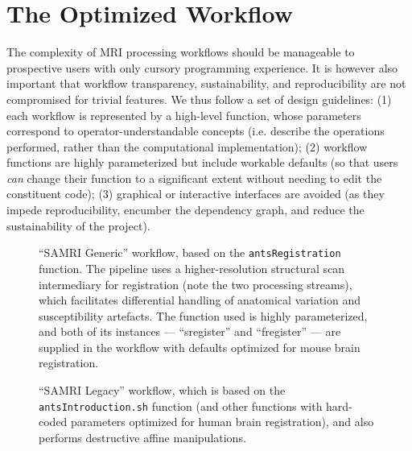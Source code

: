 \section{The Optimized Workflow}
The complexity of MRI processing workflows should be manageable to prospective users with only cursory programming experience.
It is however also important that workflow transparency, sustainability, and reproducibility are not compromised for trivial features.
We thus follow  a set of design guidelines:
(1) each workflow is represented by a high-level function, whose parameters correspond to operator-understandable concepts (i.e. describe the operations performed, rather than the computational implementation);
(2) workflow functions are highly parameterized but include workable defaults (so that users \textit{can} change their function to a significant extent without needing to edit the constituent code);
(3) graphical or interactive interfaces are avoided (as they impede reproducibility, encumber the dependency graph, and reduce the sustainability of the project).

\begin{figure*}[h!]
	\begin{subfigure}{.64\textwidth}
		\centering
		\vspace{1.4em}
		\caption{
			“SAMRI Generic”  workflow, based on the \textcolor{mg}{\texttt{antsRegistration}} function.
			The pipeline uses a higher-resolution structural scan intermediary for registration (note the two processing streams), which facilitates differential handling of anatomical variation and susceptibility artefacts.
			The function used is highly parameterized, and both of its instances --- “s\niceus register” and “f\niceus register” --- are supplied in the workflow with defaults optimized for mouse brain registration.
			}
		\label{fig:wfgg}
	\end{subfigure}\hfill
	\begin{subfigure}{.34\textwidth}
		\centering
		\vspace{-1.9em}
		\caption{
			“SAMRI Legacy” workflow, which is based on the \textcolor{mg}{\texttt{antsIntroduction.sh}} function (and other functions with hard-coded parameters optimized for human brain registration), and also performs destructive affine manipulations.
			}
		\label{fig:wfgl}
	\end{subfigure}
	\caption{
		Directed acyclic graphs depicting the two alternate MRI registration workflows and their constituent processing steps.
		The package correspondence of each processing node is appended in parantheses to the node name.
		The “utility” indication corresponds to nodes based on Python functions specific to the workflow, distributed alongside it, and dynamically wrapped via Nipype.
		The “extra\niceus interfaces” indication corresponds to nodes using explicitly defined Nipype-style interfaces, which are specific to the workflow and distributed alongside it.
		}
	\label{fig:wfg}
\end{figure*}

